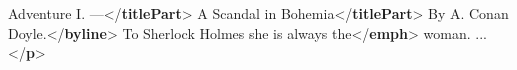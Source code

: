 \begin{shaded}
\hspace*{1em}\hspace*{1em}\hspace*{1em}\mbox{}\newline 
\hspace*{1em}\hspace*{1em}\hspace*{1em}\hspace*{1em}Adventure I. —{</\textbf{titlePart}>}\mbox{}\newline 
\hspace*{1em}\hspace*{1em}\hspace*{1em}\hspace*{1em}A Scandal in Bohemia{</\textbf{titlePart}>}\mbox{}\newline 
\hspace*{1em}\hspace*{1em}\hspace*{1em}\mbox{}\newline 
\hspace*{1em}\hspace*{1em}\hspace*{1em}By A. Conan Doyle.{</\textbf{byline}>}\mbox{}\newline 
\hspace*{1em}\hspace*{1em}\mbox{}\newline 
\hspace*{1em}\hspace*{1em}\mbox{}\newline 
\hspace*{1em}\hspace*{1em}\hspace*{1em}To Sherlock Holmes she is always\mbox{}\newline 
\hspace*{1em}\hspace*{1em}\hspace*{1em}the{</\textbf{emph}>} woman. ... {</\textbf{p}>}\mbox{}\newline 

\end{shaded}
